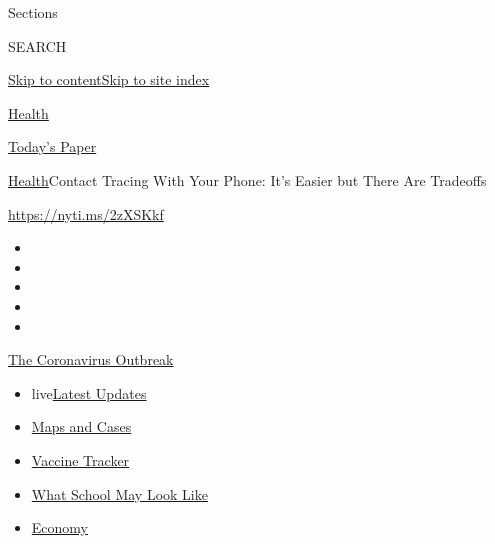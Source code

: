 Sections

SEARCH

\protect\hyperlink{site-content}{Skip to
content}\protect\hyperlink{site-index}{Skip to site index}

\href{https://www.nytimes3xbfgragh.onion/section/health}{Health}

\href{https://myaccount.nytimes3xbfgragh.onion/auth/login?response_type=cookie\&client_id=vi}{}

\href{https://www.nytimes3xbfgragh.onion/section/todayspaper}{Today's
Paper}

\href{/section/health}{Health}\textbar{}Contact Tracing With Your Phone:
It's Easier but There Are Tradeoffs

\href{https://nyti.ms/2zXSKkf}{https://nyti.ms/2zXSKkf}

\begin{itemize}
\item
\item
\item
\item
\item
\end{itemize}

\href{https://www.nytimes3xbfgragh.onion/news-event/coronavirus?action=click\&pgtype=Article\&state=default\&region=TOP_BANNER\&context=storylines_menu}{The
Coronavirus Outbreak}

\begin{itemize}
\tightlist
\item
  live\href{https://www.nytimes3xbfgragh.onion/2020/08/01/world/coronavirus-covid-19.html?action=click\&pgtype=Article\&state=default\&region=TOP_BANNER\&context=storylines_menu}{Latest
  Updates}
\item
  \href{https://www.nytimes3xbfgragh.onion/interactive/2020/us/coronavirus-us-cases.html?action=click\&pgtype=Article\&state=default\&region=TOP_BANNER\&context=storylines_menu}{Maps
  and Cases}
\item
  \href{https://www.nytimes3xbfgragh.onion/interactive/2020/science/coronavirus-vaccine-tracker.html?action=click\&pgtype=Article\&state=default\&region=TOP_BANNER\&context=storylines_menu}{Vaccine
  Tracker}
\item
  \href{https://www.nytimes3xbfgragh.onion/interactive/2020/07/29/us/schools-reopening-coronavirus.html?action=click\&pgtype=Article\&state=default\&region=TOP_BANNER\&context=storylines_menu}{What
  School May Look Like}
\item
  \href{https://www.nytimes3xbfgragh.onion/live/2020/07/31/business/stock-market-today-coronavirus?action=click\&pgtype=Article\&state=default\&region=TOP_BANNER\&context=storylines_menu}{Economy}
\end{itemize}

